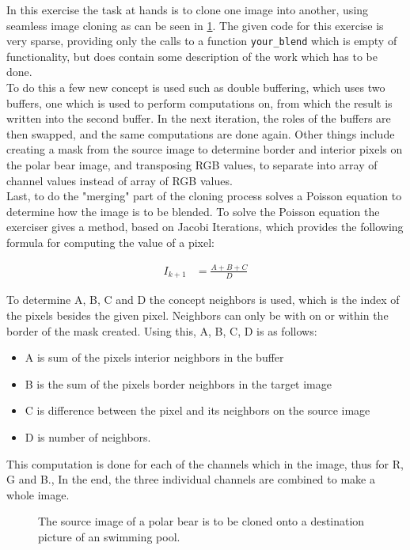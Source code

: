 In this exercise the task at hands is to clone one image into another, using seamless image cloning as can be seen in \cref{fig:cloning}. The given code for this exercise is very sparse, providing only the calls to a function \texttt{your\_blend} which is empty of functionality, but does contain some description of the work which has to be done.\\

To do this a few new concept is used such as double buffering, which uses two buffers, one which is used to perform computations on, from which the result is written into the second buffer. In the next iteration, the roles of the buffers are then swapped, and the same computations are done again. Other things include creating a mask from the source image to determine border and interior pixels on the polar bear image, and transposing RGB values, to separate into array of channel values instead of array of RGB values.\\

Last, to do the "merging" part of the cloning process solves a Poisson equation to determine how the image is to be blended. To solve the Poisson equation the exerciser gives a method, based on Jacobi Iterations, which provides the following formula for computing the value of a pixel:

\begin{align*}
I_{k+1} &= \frac{A + B + C}{D}
\end{align*} 

To determine A, B, C and D the concept neighbors is used, which is the index of the pixels besides the given pixel. Neighbors can only be with on or within the border of the mask created. Using this, A, B, C, D is as follows:

\begin{itemize}
	\item A is sum of the pixels interior neighbors in the buffer
	\item B is the sum of the pixels border neighbors in the target image
	\item C is difference between the pixel and its neighbors on the source image
	\item D is number of neighbors.
\end{itemize}

This computation is done for each of the channels which in the image, thus for R, G and B., In the end, the three individual channels are combined to make a whole image.

\begin{figure}[ht]
	\centering
	\caption{The source image of a polar bear is to be cloned onto a destination picture of an swimming pool.}
	\label{fig:cloning}
\end{figure}

